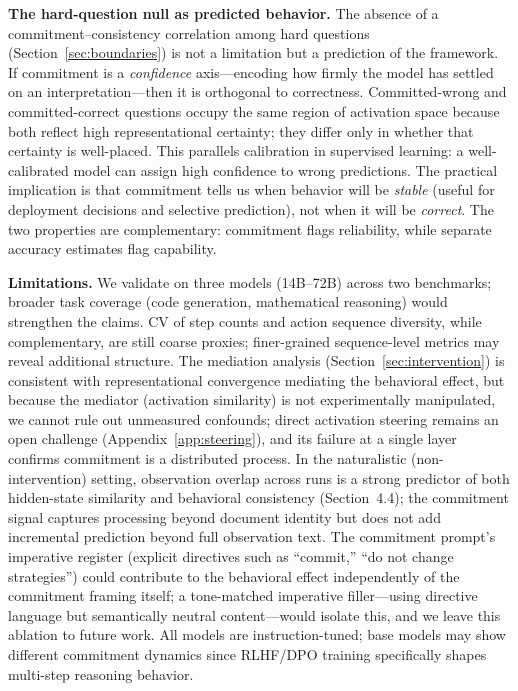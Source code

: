 \documentclass{article}
\begin{document}
\textbf{The hard-question null as predicted behavior.} The absence of a commitment--consistency correlation among hard questions (Section~\ref{sec:boundaries}) is not a limitation but a prediction of the framework. If commitment is a \emph{confidence} axis—encoding how firmly the model has settled on an interpretation—then it is orthogonal to correctness. Committed-wrong and committed-correct questions occupy the same region of activation space because both reflect high representational certainty; they differ only in whether that certainty is well-placed. This parallels calibration in supervised learning: a well-calibrated model can assign high confidence to wrong predictions. The practical implication is that commitment tells us when behavior will be \emph{stable} (useful for deployment decisions and selective prediction), not when it will be \emph{correct}. The two properties are complementary: commitment flags reliability, while separate accuracy estimates flag capability.

\textbf{Limitations.} We validate on three models (14B--72B) across two benchmarks; broader task coverage (code generation, mathematical reasoning) would strengthen the claims. CV of step counts and action sequence diversity, while complementary, are still coarse proxies; finer-grained sequence-level metrics may reveal additional structure. The mediation analysis (Section~\ref{sec:intervention}) is consistent with representational convergence mediating the behavioral effect, but because the mediator (activation similarity) is not experimentally manipulated, we cannot rule out unmeasured confounds; direct activation steering remains an open challenge (Appendix~\ref{app:steering}), and its failure at a single layer confirms commitment is a distributed process. In the naturalistic (non-intervention) setting, observation overlap across runs is a strong predictor of both hidden-state similarity and behavioral consistency (Section~4.4); the commitment signal captures processing beyond document identity but does not add incremental prediction beyond full observation text. The commitment prompt's imperative register (explicit directives such as ``commit,'' ``do not change strategies'') could contribute to the behavioral effect independently of the commitment framing itself; a tone-matched imperative filler---using directive language but semantically neutral content---would isolate this, and we leave this ablation to future work. All models are instruction-tuned; base models may show different commitment dynamics since RLHF/DPO training specifically shapes multi-step reasoning behavior.
\end{document}
